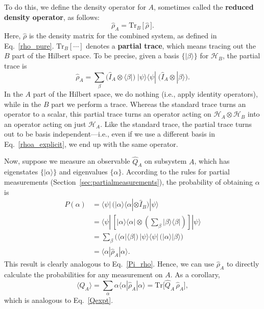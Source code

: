 \documentclass[prx,12pt]{revtex4-2}
\begin{document}
To do this, we define the density operator for $A$, sometimes called
the \textbf{reduced density operator}, as follows:
\begin{equation}
  \hat{\rho}_A = \mathrm{Tr}_B \,\big[\,\hat{\rho}\,\big].
  \label{rhoa_def}
\end{equation}
Here, $\hat{\rho}$ is the density matrix for the combined system, as
defined in Eq.~\eqref{rho_pure}.  $\mathrm{Tr}_B[\cdots]$ denotes a
\textbf{partial trace}, which means tracing out the $B$ part of the
Hilbert space.  To be precise, given a basis $\{|\beta\rangle\}$ for
$\mathscr{H}_B$, the partial trace is
\begin{equation}
  \hat{\rho}_A =
    \sum_\beta
    \Big( \hat{I}_A\otimes \langle \beta| \Big)
    \; |\psi\rangle \langle \psi | \;
    \Big( \hat{I}_A \otimes | \beta\rangle \Big).
    \label{rhoa_explicit}
\end{equation}
In the $A$ part of the Hilbert space, we do nothing (i.e., apply
identity operators), while in the $B$ part we perform a trace.
Whereas the standard trace turns an operator to a scalar, this partial
trace turns an operator acting on $\mathscr{H}_A \otimes
\mathscr{H}_B$ into an operator acting on just $\mathscr{H}_A$.  Like
the standard trace, the partial trace turns out to be basis
independent---i.e., even if we use a different basis in
Eq.~\eqref{rhoa_explicit}, we end up with the same operator.

Now, suppose we measure an observable $\hat{Q}_A$ on subsystem $A$,
which has eigenstates $\{|\alpha\rangle\}$ and eigenvalues
$\{\alpha\}$.  According to the rules for partial measurements
(Section~\ref{sec:partialmeasurements}), the probability of obtaining
$\alpha$ is
\begin{align}
  P(\alpha)
    &=
    \langle \psi | \,
    \Big( |\alpha\rangle \langle \alpha| \otimes \hat{I}_B\Big) |\psi\rangle \\
    &=
    \langle \psi | \,
    \left[ |\alpha\rangle \langle \alpha| \otimes
      \left(\sum_\beta | \beta\rangle \langle \beta|\right) \right]
    |\psi\rangle \\
    &=
    \sum_\beta
    \Big( \langle \alpha| \langle \beta| \Big)
    \, |\psi\rangle \langle \psi | \,
    \Big( |\alpha\rangle | \beta\rangle \Big) \\
    &= \langle \alpha | \hat{\rho}_A | \alpha \rangle.
    \label{rho_prob}
\end{align}
This result is clearly analogous to Eq.~\eqref{Pi_rho}.  Hence, we can
use $\hat{\rho}_A$ to directly calculate the probabilities for any
measurement on $A$.  As a corollary,
\begin{equation}
  \langle Q_A \rangle = \sum_\alpha \alpha
  \langle \alpha | \hat{\rho}_A | \alpha \rangle
  = \mathrm{Tr}\Big[\hat{Q}_A \, \hat{\rho}_A \Big],
  \label{rho_expect}
\end{equation}
which is analogous to Eq.~\eqref{Qexpt}.
    
\end{document}
